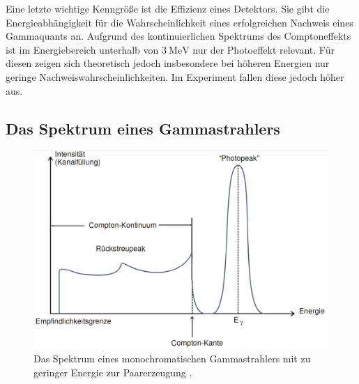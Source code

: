 Eine letzte wichtige Kenngröße ist die Effizienz eines Detektors. Sie gibt die Energieabhängigkeit für die Wahrscheinlichkeit eines erfolgreichen Nachweis eines Gammaquants an. Aufgrund des kontinuierlichen Spektrums des Comptoneffekts ist im Energiebereich unterhalb von $\SI{3}{\mega\electronvolt}$ nur der Photoeffekt relevant. Für diesen zeigen sich theoretisch jedoch insbesondere bei höheren Energien nur geringe Nachweiswahrscheinlichkeiten. Im Experiment fallen diese jedoch höher aus. 

\subsection{Das Spektrum eines Gammastrahlers}

\begin{figure}
	\centering
	\includegraphics[width=\linewidth-100pt,height=\textheight-100pt,keepaspectratio]{content/Images/spek.png}
    \caption{Das Spektrum eines monochromatischen Gammastrahlers mit zu geringer Energie zur Paarerzeugung  \cite{V18}.}
    \label{fig:spektrum}
\end{figure}

